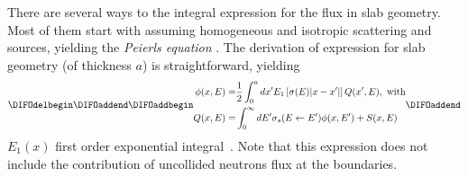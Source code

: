 There are several ways to \DIFdelbegin {}\DIFdelend \DIFaddbegin {}\DIFaddend the integral expression for the flux in slab geometry. Most of them start with assuming homogeneous and isotropic scattering and sources, yielding the \emph{Peierls equation} \cite{Davison-1957,Case-1967,Bell-1970,Pomraning-1973,Duderstadt-1979,Lewis-1984}. The derivation of expression for slab geometry (of thickness $a$) is straightforward, yielding
\begin{equation}\label{eq:flux-slab-l-0-no-bndry-terms}
\DIFdelbegin %
\DIFdelend \DIFaddbegin \begin{split}
\phi(x,E)=&\frac{1}{2}\int_0^a { dx'
	E_1\left[\sigma(E)\lvert x-x'\rvert\right] Q(x',E)
}, \text{ with} \\
Q(x,E) =& \int_0^\infty { dE'
		\sigma_s(E \leftarrow E')\phi(x,E') + S(x,E)
}
\end{split}\DIFaddend 
\end{equation}
\DIFdelbegin {}\DIFdelend \DIFaddbegin {}\DIFaddend $E_1(x)$ \DIFdelbegin {}\DIFdelend \DIFaddbegin {}\DIFaddend first order exponential integral~\cite{Abramowitz-1964}. Note that this expression does not include the contribution of uncollided neutrons \DIFdelbegin {}\DIFdelend \DIFaddbegin {}\DIFaddend flux at the boundaries.

